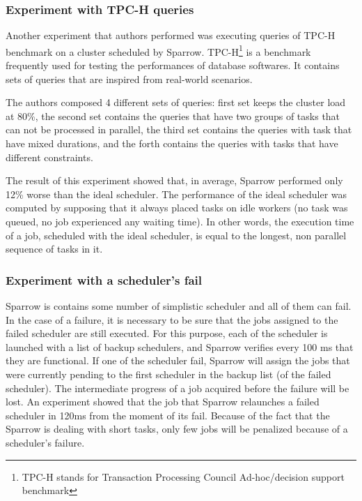 \documentclass[11pt]{article}
\begin{document}
            
        \subsubsection*{Experiment with TPC-H queries}
        
        	Another experiment that authors performed was executing queries of TPC-H benchmark on a cluster scheduled by Sparrow. TPC-H\footnote{TPC-H stands for Transaction Processing Council Ad-hoc/decision support benchmark} is a benchmark frequently used for testing the performances of database softwares. It contains sets of queries that are inspired from real-world scenarios.
            
            The authors composed 4 different sets of queries: first set keeps the cluster load at 80\%, the second set contains the queries that have two groups of tasks that can not be processed in parallel, the third set contains the queries with task that have mixed durations, and the forth contains the queries with tasks that have different constraints.
            
            The result of this experiment showed that, in average, Sparrow performed only 12\% worse than the ideal scheduler. The performance of the ideal scheduler was computed by supposing that it always placed tasks on idle workers (no task was queued, no job experienced any waiting time). In other words, the execution time of a job, scheduled with the ideal scheduler, is equal to the longest, non parallel sequence of tasks in it.
        
        
        \subsubsection*{Experiment with a scheduler's fail}
        
        	Sparrow is contains some number of simplistic scheduler and all of them can fail. In the case of a failure, it is necessary to be sure that the jobs assigned to the failed scheduler are still executed. For this purpose, each of the scheduler is launched with a list of backup schedulers, and Sparrow verifies every 100 ms that they are functional. If one of the scheduler fail, Sparrow will assign the jobs that were currently pending to the first scheduler in the backup list (of the failed scheduler). The intermediate progress of a job acquired before the failure will be lost. An experiment showed that the job that Sparrow relaunches a failed scheduler in 120ms from the moment of its fail. Because of the fact that the Sparrow is dealing with short tasks, only few jobs will be penalized because of a scheduler's failure.
        
\end{document}

